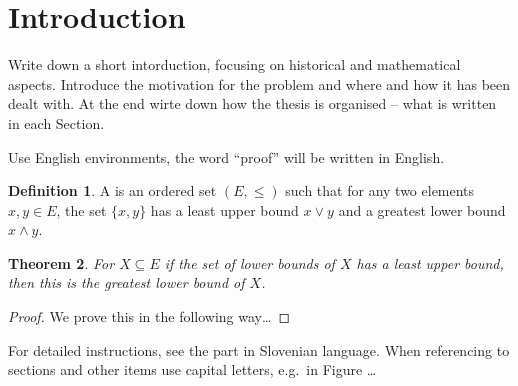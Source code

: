 \documentclass[12pt,a4paper,twoside]{article}
\theoremstyle{definition} %
\newtheorem{definition}{Definition}[section]
\theoremstyle{plain} %
\newtheorem{theorem}[definition]{Theorem}
\numberwithin{equation}{section}  %
\begin{document}
\cleardoublepage

\setcounter{page}{1}    %

\section{Introduction}
Write down a short intorduction, focusing on historical and mathematical aspects. Introduce the
motivation for the problem and where and how it has been dealt with. At the end wirte down how the
thesis is organised -- what is written in each Section.

Use English environments, the word ``proof'' will be written in English.
\begin{definition}
A \emph{} is an ordered set $(E, \leq)$ such that for any two elements $x,y \in E$,
the set $\{x,y\}$ has a least upper bound $x \vee y$ and a greatest lower bound $x \wedge y$.
\end{definition}

\begin{theorem}
For $X \subseteq E$ if the set of lower bounds of $X$ has a least upper bound, then this is the
greatest lower bound of $X$.
\end{theorem}

\begin{proof}
We prove this in the following way\dots
\end{proof}

For detailed instructions, see the part in Slovenian language. When referencing to sections and
other items use capital letters, e.g.\ in Figure \dots
\end{document}
